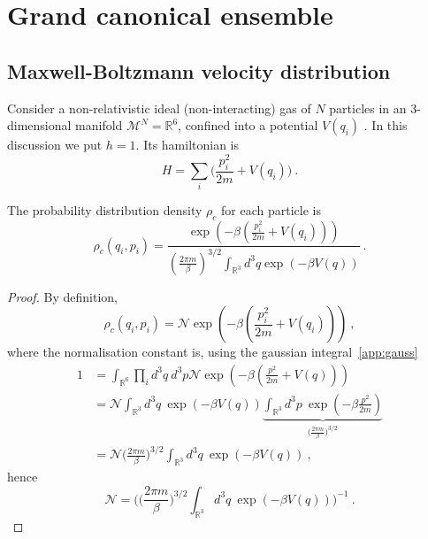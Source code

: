 \chapter{Grand canonical ensemble}

\section{Maxwell-Boltzmann velocity distribution}

    Consider a non-relativistic ideal (non-interacting) gas of $N$ particles in an $3$-dimensional manifold $\mathcal M^N = \mathbb R^6$, confined into a potential $V(q_i)$ . In this discussion we put $h = 1$. Its hamiltonian is 
    \begin{equation*}
        H = \sum_i \Big ( \frac{p^2_i}{2m} + V(q_i) \Big ) ~.
    \end{equation*}

    The probability distribution density $\rho_c$ for each particle is 
    \begin{equation*}
        \rho_c (q_i, p_i) = \frac{\exp (- \beta ( \frac{p^2_i}{2m} + V(q_i) ))}{(\frac{2\pi m}{\beta})^{3/2} \int_{\mathbb R^3} d^3 q \exp(- \beta V(q))} ~.
    \end{equation*}
    \begin{proof}
        By definition, 
        \begin{equation*}
            \rho_c (q_i, p_i) = \mathcal N \exp (- \beta ( \frac{p^2_i}{2m} + V(q_i) )) ~,
        \end{equation*}
        where the normalisation constant is, using the gaussian integral~\eqref{app:gauss} 
        \begin{equation*}
        \begin{aligned}
            1 & = \int_{\mathbb R^6} \prod_i d^3 q ~ d^3 p \mathcal N \exp(- \beta ( \frac{p^2}{2m} + V(q))) \\ & = \mathcal N \int_{\mathbb R^3} d^3 q ~ \exp(- \beta V(q))  \underbrace{\int_{\mathbb R^3} d^3 p ~ \exp(- \beta \frac{p^2}{2m})}_{\Big ( \frac{2\pi m}{\beta}\Big)^{3/2}} \\ & = \mathcal N  \Big ( \frac{2\pi m}{\beta}\Big)^{3/2} \int_{\mathbb R^3} d^3 q ~ \exp(- \beta V(q)) ~,
        \end{aligned}
        \end{equation*}
        hence 
        \begin{equation*}
            \mathcal N = \Big ( \Big ( \frac{2\pi m}{\beta}\Big)^{3/2} \int_{\mathbb R^3} d^3 q ~ \exp(- \beta V(q))  \Big )^{-1} ~.
        \end{equation*}
    \end{proof}

